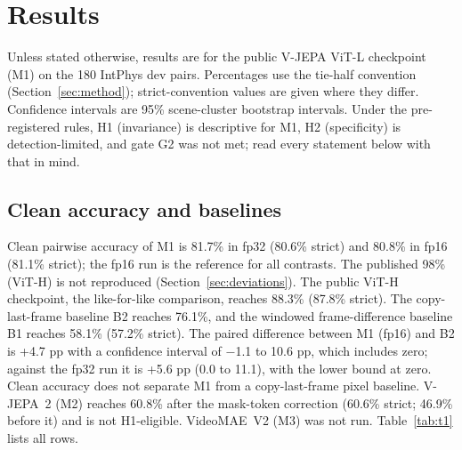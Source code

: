 \section{Results}
\label{sec:results}
Unless stated otherwise, results are for the public V-JEPA ViT-L checkpoint (M1) on the 180 IntPhys dev pairs. Percentages use the tie-half convention (Section~\ref{sec:method}); strict-convention values are given where they differ. Confidence intervals are 95\% scene-cluster bootstrap intervals. Under the pre-registered rules, H1 (invariance) is descriptive for M1, H2 (specificity) is detection-limited, and gate G2 was not met; read every statement below with that in mind.

\subsection{Clean accuracy and baselines}
\label{sec:res-clean}
Clean pairwise accuracy of M1 is 81.7\% in fp32 (80.6\% strict) and 80.8\% in fp16 (81.1\% strict); the fp16 run is the reference for all contrasts. The published 98\% (ViT-H) is not reproduced (Section~\ref{sec:deviations}). The public ViT-H checkpoint, the like-for-like comparison, reaches 88.3\% (87.8\% strict). The copy-last-frame baseline B2 reaches 76.1\%, and the windowed frame-difference baseline B1 reaches 58.1\% (57.2\% strict). The paired difference between M1 (fp16) and B2 is +4.7 pp with a confidence interval of $-$1.1 to 10.6 pp, which includes zero; against the fp32 run it is +5.6 pp (0.0 to 11.1), with the lower bound at zero. Clean accuracy does not separate M1 from a copy-last-frame pixel baseline. V-JEPA~2 (M2) reaches 60.8\% after the mask-token correction (60.6\% strict; 46.9\% before it) and is not H1-eligible. VideoMAE~V2 (M3) was not run. Table~\ref{tab:t1} lists all rows.


